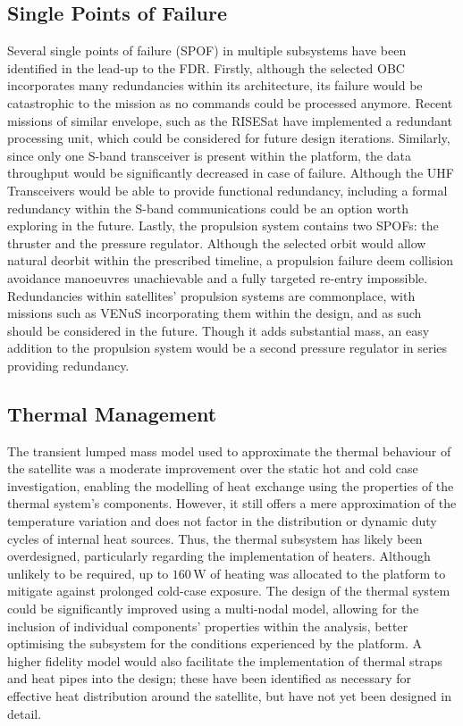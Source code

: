 \documentclass[a4paper, 11pt, conference]{IEEEtran}
\begin{document}
\subsection{Single Points of Failure}
Several single points of failure (SPOF) in multiple subsystems have been identified in the lead-up to the FDR. Firstly, although the selected OBC incorporates many redundancies within its architecture, its failure would be catastrophic to the mission as no commands could be processed anymore. Recent missions of similar envelope, such as the RISESat \cite{RISESat_eoportal_2024} have implemented a redundant processing unit, which could be considered for future design iterations. Similarly, since only one S-band transceiver is present within the platform, the data throughput would be significantly decreased in case of failure. Although the UHF Transceivers would be able to provide functional redundancy, including a formal redundancy within the S-band communications could be an option worth exploring in the future. Lastly, the propulsion system contains two SPOFs: the thruster and the pressure regulator. Although the selected orbit would allow natural deorbit within the prescribed timeline, a propulsion failure deem collision avoidance manoeuvres unachievable and a fully targeted re-entry impossible. Redundancies within satellites’ propulsion systems are commonplace, with missions such as VENuS \cite{Venus_eoportal} incorporating them within the design, and as such should be considered in the future. Though it adds substantial mass, an easy addition to the propulsion system would be a second pressure regulator in series providing redundancy.

\subsection{Thermal Management}
The transient lumped mass model used to approximate the thermal behaviour of the satellite was a moderate improvement over the static hot and cold case investigation, enabling the modelling of heat exchange using the properties of the thermal system’s components. However, it still offers a mere approximation of the temperature variation and does not factor in the distribution or dynamic duty cycles of internal heat sources. Thus, the thermal subsystem has likely been overdesigned, particularly regarding the implementation of heaters. Although unlikely to be required, up to $160\,\mathrm{W}$ of heating was allocated to the platform to mitigate against prolonged cold-case exposure. The design of the thermal system could be significantly improved using a multi-nodal model, allowing for the inclusion of individual components’ properties within the analysis, better optimising the subsystem for the conditions experienced by the platform. A higher fidelity model would also facilitate the implementation of thermal straps and heat pipes into the design; these have been identified as necessary for effective heat distribution around the satellite, but have not yet been designed in detail.  
\end{document}

